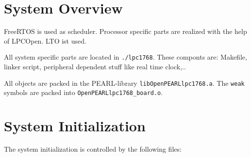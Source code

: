 \section{System Overview}
FreeRTOS is used as scheduler. Processor specific parts are
realized with the help of LPCOpen. LTO ist used.

All system specific parts are located in \texttt{./lpc1768}. 
These componts are:
Makefile, linker script, peripheral dependent stuff like real time clock,..

All objects are packed in the PEARL-library 
\verb|libOpenPEARLlpc1768.a|. The \texttt{weak} symbols are
packed into \texttt{OpenPEARLlpc1768\_board.o}.

\section{System Initialization}
The system initialization  is controlled by the following files:
